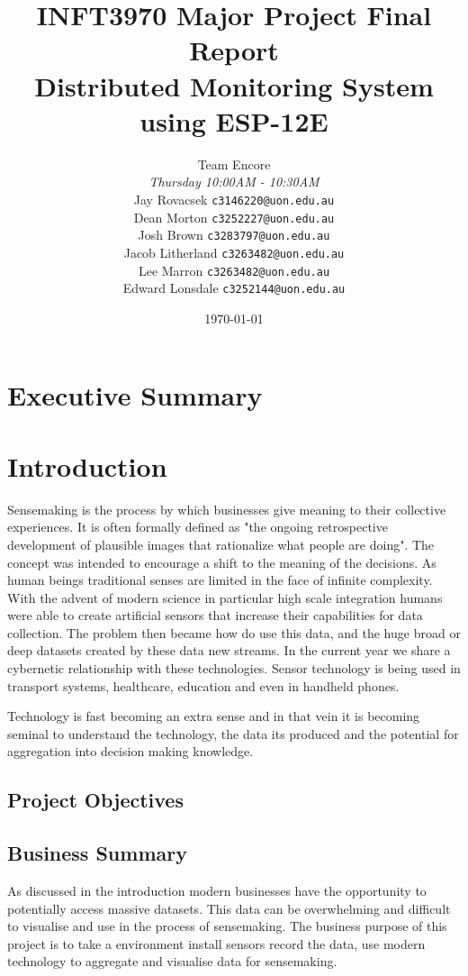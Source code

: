 \documentclass[a4paper,12pt,headings=normal]{article}
\title{INFT3970 Major Project Final Report \protect\\
    Distributed Monitoring System using ESP-12E}
\author{
        Team Encore\\
        \textit{Thursday 10:00AM - 10:30AM}\\
        Jay Rovacsek
        \texttt{c3146220@uon.edu.au}\\
        Dean Morton
        \texttt{c3252227@uon.edu.au}\\
        Josh Brown
        \texttt{c3283797@uon.edu.au}\\
        Jacob Litherland
        \texttt{c3263482@uon.edu.au}\\
        Lee Marron
        \texttt{c3263482@uon.edu.au}\\
        Edward Lonsdale
        \texttt{c3252144@uon.edu.au}
    }
\date{\today}
\begin{document}
    \begin{titlingpage}
        \maketitle
    \end{titlingpage}

    \tableofcontents
    
    \newpage

    \section{Executive Summary}

    \newpage
    \section{Introduction}
        Sensemaking is the process by which businesses give meaning to their collective experiences. 
        It is often formally defined as "the ongoing retrospective development of plausible images 
        that rationalize what people are doing"\cite{Sensemaking}. The concept 
        was intended to encourage a shift to the meaning of the decisions. As human beings traditional 
        senses are limited in the face of infinite complexity. With the advent of modern science in particular 
        high scale integration humans were able to create artificial sensors that increase their capabilities 
        for data collection. The problem then became how do use this data, and the huge broad or deep datasets 
        created by these data new streams. In the current year we share a cybernetic relationship with these 
        technologies. Sensor technology is being used in transport systems, healthcare, education and even 
        in handheld phones. 

        Technology is fast becoming an extra sense and in that vein it is becoming seminal to understand 
        the technology, the data its produced and the potential for aggregation into decision making knowledge. 
    
        \subsection{Project Objectives}
        \subsection{Business Summary}
            As discussed in the introduction modern businesses have the opportunity to potentially 
            access massive datasets. This data can be overwhelming  and difficult to visualise 
            and use in the process of sensemaking. The business purpose of this project is to 
            take a environment install sensors record the data, use modern technology to 
            aggregate and  visualise data for sensemaking. 
\end{document}
